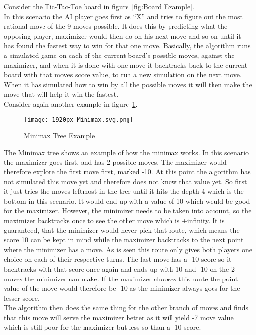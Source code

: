 Consider the Tic-Tac-Toe board in figure~\ref{fig:Board Example}.\\


In this scenario the AI player goes first as “X” and tries to figure out the most rational move of the 9 moves possible. 
It does this by predicting what the opposing player, maximizer would then do on his next move and so on until it has found the fastest way to win for that one move. 
Basically, the algorithm runs a simulated game on each of the current board’s possible moves, against the maximizer, 
and when it is done with one move it backtracks back to the current board with that moves score value, to run a new simulation on the next move. 
When it has simulated how to win by all the possible moves it will then make the move that will help it win the fastest.\\

Consider again another example in figure~\ref{fig:Tree Example}.\\
\begin{figure}
    \caption{Minimax Tree Example}
    \texttt{[image: 1920px-Minimax.svg.png]}\\
    \label{fig:Tree Example}
\end{figure}

The Minimax tree shows an example of how the minimax works. In this scenario the maximizer goes first, and has 2 possible moves. 
The maximizer would therefore explore the first move first, marked -10. At this point the algorithm has not simulated this move yet and therefore does not know that value yet. 
So first it just tries the moves leftmost in the tree until it hits the depth 4 which is the bottom in this scenario. It would end up with a value of 10 which would be good for the maximizer. 
However, the minimizer needs to be taken into account, so the maximizer backtracks once to see the other move which is +infinity. 
It is guaranteed, that the minimizer would never pick that route, which means the score 10 can be kept in mind while the maximizer backtracks to the next point where the minimizer has a move. 
As is seen this route only gives both players one choice on each of their respective turns. 
The last move has a -10 score so it backtracks with that score once again and ends up with 10 and -10 on the 2 moves the minimizer can make. 
If the maximizer chooses this route the point value of the move would therefore be -10 as the minimizer always goes for the lesser score.\\
The algorithm then does the same thing for the other branch of moves and finds that this move will serve the maximizer better as it will yield -7 move value which is still poor for the maximizer but less so than a -10 score.

